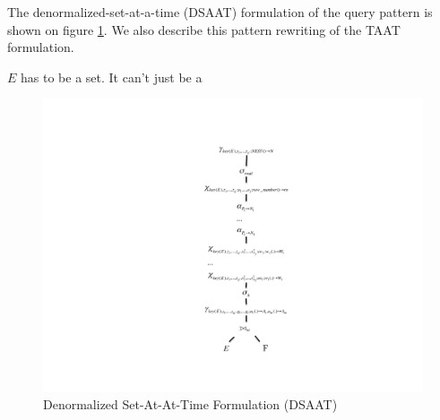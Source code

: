 The denormalized-set-at-a-time (DSAAT) formulation of the query pattern is shown on figure \ref{fig:R4}. We also describe this pattern rewriting of the TAAT formulation. 





$E$ has to be a set. It can't just be a 

\begin{figure}[h]
\label{fig:R4}
\centering
\caption{Denormalized Set-At-At-Time Formulation (DSAAT)}
\includegraphics[width=0.65 \linewidth]{images/R4.pdf}
\end{figure}